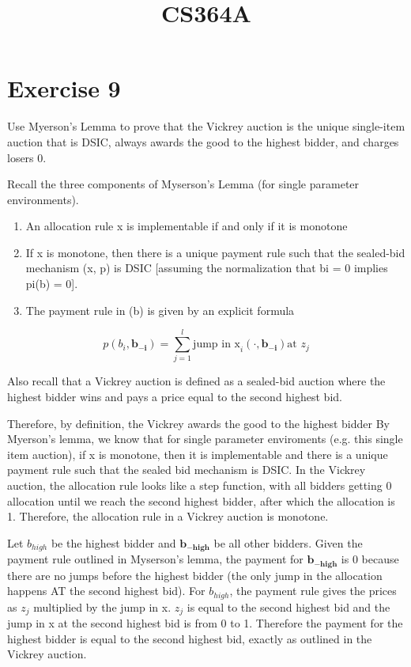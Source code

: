 \documentclass{article}
\title{CS364A \exerciseset}
\author{\studentname}
\begin{document}
\maketitle

\section*{Exercise 9}
Use Myerson’s Lemma to prove that the Vickrey auction is the unique single-item auction that is DSIC,
always awards the good to the highest bidder, and charges losers 0.

Recall the three components of Myserson's Lemma (for single parameter
environments).
\begin{enumerate}
\item An allocation rule x is implementable if and only if it is monotone
\item If x is monotone, then there is a unique payment rule such that the sealed-bid mechanism (x, p) is DSIC [assuming the normalization that bi = 0 implies pi(b) = 0]. 
\item The payment rule in (b) is given by an explicit formula 
\end{enumerate}

\begin{equation}
	p(b_i, \bm{b_{-i}}) = \sum_{j=1}^{l}\text{jump in x}_i(\cdot,
	\bm{b_{-i}})\text{at $z_j$}
\end{equation}

Also recall that a Vickrey auction is defined as a sealed-bid auction where
the highest bidder wins and pays a price equal to the second highest bid.

Therefore, by definition, the Vickrey awards the good to the highest bidder
By Myerson's lemma, we know that for single parameter
enviroments (e.g. this single item auction), if x is monotone, then it is
implementable and there is a unique payment rule such that the sealed bid
mechanism is DSIC. In the Vickrey auction, the allocation rule looks like a
step function, with all bidders getting 0 allocation until we reach the
second highest bidder, after which the allocation is 1. Therefore, the
allocation rule in a Vickrey auction is monotone.

Let $b_{high}$ be the highest bidder and $\bm{b_{-high}}$ be all other
bidders.  Given the payment rule outlined in Myserson's lemma, the payment for
$\bm{b_{-high}}$ is 0 because there are no jumps before the highest bidder
(the only jump in the allocation happens AT the second highest bid).  For
$b_{high}$, the payment rule gives the prices as $z_j$ multiplied by the jump
in x.  $z_j$ is equal to the second highest bid and the jump in x at the
second highest bid is from 0 to 1.  Therefore the payment for the highest
bidder is equal to the second highest bid, exactly as outlined in the Vickrey
auction. 
\end{document}

